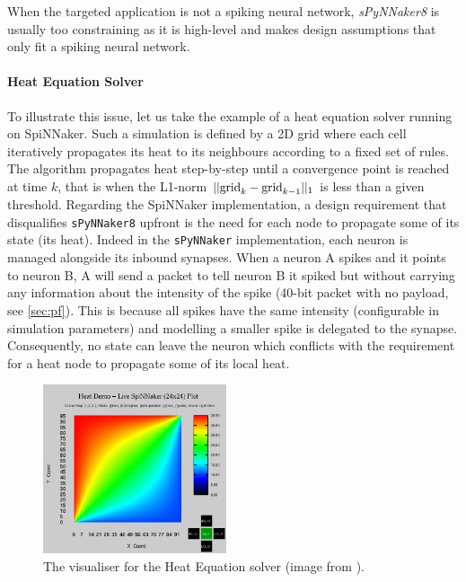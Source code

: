 When the targeted application is not a spiking neural network, \textit{sPyNNaker8} is usually too constraining as it is high-level and makes design assumptions that only fit a spiking neural network.

\paragraph{Heat Equation Solver} \label{sec:hes}

To illustrate this issue, let us take the example of a heat equation solver running on SpiNNaker. Such a simulation is defined by a 2D grid where each cell iteratively propagates its heat to its neighbours according to a fixed set of rules. The algorithm propagates heat step-by-step until a convergence point is reached at time $k$, that is when the L1-norm $|| \textnormal{grid}_k - \textnormal{grid}_{k-1} ||_1 $ is less than a given threshold. Regarding the SpiNNaker implementation, a design requirement that disqualifies \texttt{sPyNNaker8} upfront is the need for each node to propagate some of its state (its heat). Indeed in the \texttt{sPyNNaker} implementation, each neuron is managed alongside its inbound synapses. When a neuron A spikes and it points to neuron B, A will send a packet to tell neuron B it spiked but without carrying any information about the intensity of the spike (40-bit packet with no payload, see \ref{sec:pf}). This is because all spikes have the same intensity (configurable in simulation parameters) and modelling a smaller spike is delegated to the synapse. Consequently, no state can leave the neuron which conflicts with the requirement for a heat node to propagate some of its local heat. \\

\begin{figure}
    \begin{center}
    \includegraphics[width=0.48\textwidth]{figures/heatvis.png}
  	\caption{The visualiser for the Heat Equation solver (image from \cite{heatvis}).}
  	\label{fig:heatvis}    
    \end{center}
\end{figure}

